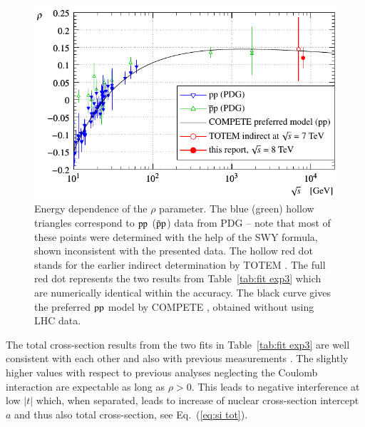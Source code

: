 \begin{figure}
\begin{center}
\includegraphics{fig/rho_s.pdf}
\caption{Energy dependence of the $\rho$ parameter. The blue (green) hollow triangles correspond to $\rm pp$ ($\rm \bar pp$) data from PDG \cite{pdg} -- note that most of these points were determined with the help of the SWY formula, shown inconsistent with the presented data. The hollow red dot stands for the earlier indirect determination by TOTEM \cite{epl101-tot}. The full red dot represents the two results from Table~\ref{tab:fit exp3} which are numerically identical within the accuracy. The black curve gives the preferred $\rm pp$ model by COMPETE \cite{compete}, obtained without using LHC data.
}%
\label{fig:rho cmp exp3}
\end{center}
\end{figure}


The total cross-section results from the two fits in Table~\ref{tab:fit exp3} are well consistent with each other and also with previous measurements \cite{8tev-90m,epl101-el}. The slightly higher values with respect to previous analyses neglecting the Coulomb interaction are expectable as long as $\rho > 0$. This leads to negative interference at low $|t|$ which, when separated, leads to increase of nuclear cross-section intercept $a$ and thus also total cross-section, see Eq.~(\ref{eq:si tot}).


